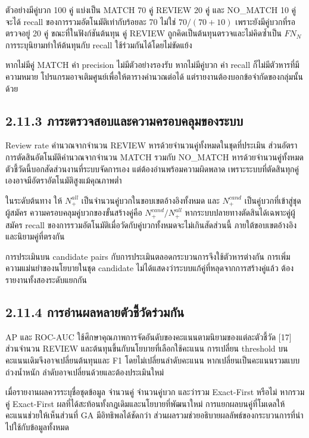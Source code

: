 ตัวอย่างมีคู่บวก 100 คู่ แบ่งเป็น MATCH 70 คู่ REVIEW 20 คู่ และ NO\_MATCH 10 คู่ จะได้ recall ของการรวมอัตโนมัติเท่ากับร้อยละ 70 ไม่ใช่ $70/(70+10)$ เพราะยังมีคู่บวกที่รอตรวจอยู่ 20 คู่ ขณะที่ในฟังก์ชันต้นทุน คู่ REVIEW ถูกคิดเป็นต้นทุนตรวจและไม่คิดซ้ำเป็น $FN_N$ การระบุนิยามทำให้ต้นทุนกับ recall ใช้ร่วมกันได้โดยไม่ขัดแย้ง

หากไม่มีคู่ MATCH ค่า precision ไม่มีตัวอย่างรองรับ หากไม่มีคู่บวก ค่า recall ก็ไม่มีตัวหารที่มีความหมาย โปรแกรมอาจเติมศูนย์เพื่อให้ตารางคำนวณต่อได้ แต่รายงานต้องบอกข้อจำกัดของกลุ่มนั้นด้วย

\subsection*{2.11.3 ภาระตรวจสอบและความครอบคลุมของระบบ}
Review rate คำนวณจากจำนวน REVIEW หารด้วยจำนวนคู่ทั้งหมดในชุดที่ประเมิน ส่วนอัตราการตัดสินอัตโนมัติคำนวณจากจำนวน MATCH รวมกับ NO\_MATCH หารด้วยจำนวนคู่ทั้งหมด ตัวชี้วัดนี้บอกสัดส่วนงานที่ระบบจัดการเอง แต่ต้องอ่านพร้อมความผิดพลาด เพราะระบบที่ตัดสินทุกคู่เองอาจมีอัตราอัตโนมัติสูงแม้คุณภาพต่ำ

ในระดับต้นทาง ให้ $N_+^{all}$ เป็นจำนวนคู่บวกในขอบเขตอ้างอิงทั้งหมด และ $N_+^{cand}$ เป็นคู่บวกที่เข้าสู่ชุดผู้สมัคร ความครอบคลุมคู่บวกของขั้นสร้างคู่คือ $N_+^{cand}/N_+^{all}$ หากระบบปลายทางตัดสินได้เฉพาะคู่ผู้สมัคร recall ของการรวมอัตโนมัติเมื่อวัดกับคู่บวกทั้งหมดจะไม่เกินสัดส่วนนี้ ภายใต้ขอบเขตอ้างอิงและนิยามคู่ที่ตรงกัน

การประเมินบน candidate pairs กับการประเมินตลอดกระบวนการจึงใช้ตัวหารต่างกัน การเพิ่มความแม่นยำของนโยบายในชุด candidate ไม่ได้แสดงว่าระบบแก้คู่ที่หลุดจากการสร้างคู่แล้ว ต้องรายงานทั้งสองระดับแยกกัน

\subsection*{2.11.4 การอ่านผลหลายตัวชี้วัดร่วมกัน}
AP และ ROC-AUC ใช้ศึกษาคุณภาพการจัดอันดับของคะแนนตามนิยามของแต่ละตัวชี้วัด [17] ส่วนจำนวน REVIEW และต้นทุนขึ้นกับนโยบายที่เลือกใช้คะแนน การเปลี่ยน threshold บนคะแนนเดิมจึงอาจเปลี่ยนต้นทุนและ F1 โดยไม่เปลี่ยนลำดับคะแนน หากเปลี่ยนเป็นคะแนนรวมแบบถ่วงน้ำหนัก ลำดับอาจเปลี่ยนด้วยและต้องประเมินใหม่

เมื่อรายงานผลควรระบุชื่อชุดข้อมูล จำนวนคู่ จำนวนคู่บวก และว่ารวม Exact-First หรือไม่ หากรวมคู่ Exact-First ผลที่ได้สะท้อนทั้งกฎเดิมและนโยบายที่พัฒนาใหม่ การแยกผลบนคู่ที่โมเดลให้คะแนนช่วยให้เห็นส่วนที่ GA มีอิทธิพลได้ชัดกว่า ส่วนผลรวมช่วยอธิบายผลลัพธ์ของกระบวนการที่นำไปใช้กับข้อมูลทั้งหมด

